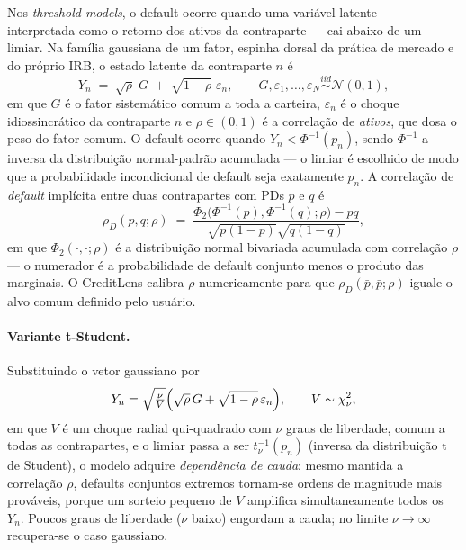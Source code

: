 \documentclass[11pt,a4paper]{article}
\begin{document}
Nos \emph{threshold models}, o default ocorre quando uma variável latente --- interpretada como o retorno dos ativos da contraparte --- cai abaixo de um limiar. Na família gaussiana de um fator, espinha dorsal da prática de mercado e do próprio IRB, o estado latente da contraparte $n$ é
\begin{equation}
Y_n \;=\; \sqrt{\rho}\;G \;+\; \sqrt{1-\rho}\;\varepsilon_n,
\qquad G,\varepsilon_1,\dots,\varepsilon_N \overset{iid}{\sim}\mathcal N(0,1),
\label{eq:threshold}
\end{equation}
em que $G$ é o fator sistemático comum a toda a carteira, $\varepsilon_n$ é o choque idiossincrático da contraparte $n$ e $\rho\in(0,1)$ é a correlação de \emph{ativos}, que dosa o peso do fator comum. O default ocorre quando $Y_n < \Phi^{-1}(p_n)$, sendo $\Phi^{-1}$ a inversa da distribuição normal-padrão acumulada --- o limiar é escolhido de modo que a probabilidade incondicional de default seja exatamente $p_n$. A correlação de \emph{default} implícita entre duas contrapartes com PDs $p$ e $q$ é
\begin{equation}
\rho_D(p,q;\rho) \;=\;
\frac{\Phi_2\!\bigl(\Phi^{-1}(p),\Phi^{-1}(q);\rho\bigr)-pq}
{\sqrt{p(1-p)}\sqrt{q(1-q)}},
\label{eq:rhoD}
\end{equation}
em que $\Phi_2(\cdot,\cdot;\rho)$ é a distribuição normal bivariada acumulada com correlação $\rho$ --- o numerador é a probabilidade de default conjunto menos o produto das marginais. O CreditLens calibra $\rho$ numericamente para que $\rho_D(\bar p,\bar p;\rho)$ iguale o alvo comum definido pelo usuário.

\paragraph{Variante t-Student.} Substituindo o vetor gaussiano por
\begin{equation}
Y_n=\sqrt{\tfrac{\nu}{V}}\Bigl(\sqrt{\rho}\,G+\sqrt{1-\rho}\,\varepsilon_n\Bigr),
\qquad V\sim\chi^2_\nu,
\end{equation}
em que $V$ é um choque radial qui-quadrado com $\nu$ graus de liberdade, comum a todas as contrapartes, e o limiar passa a ser $t_\nu^{-1}(p_n)$ (inversa da distribuição t de Student), o modelo adquire \emph{dependência de cauda}: mesmo mantida a correlação $\rho$, defaults conjuntos extremos tornam-se ordens de magnitude mais prováveis, porque um sorteio pequeno de $V$ amplifica simultaneamente todos os $Y_n$. Poucos graus de liberdade ($\nu$ baixo) engordam a cauda; no limite $\nu\to\infty$ recupera-se o caso gaussiano.
\end{document}
